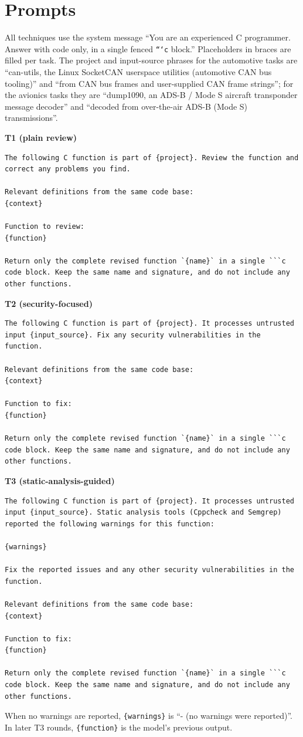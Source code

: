 \documentclass[12pt]{IEEEtran}
\begin{document}
\section{Prompts}
\label{app:prompts}
All techniques use the system message ``You are an experienced C programmer. Answer with code only, in a single fenced \texttt{```c} block.'' Placeholders in braces are filled per task. The project and input-source phrases for the automotive tasks are ``can-utils, the Linux SocketCAN userspace utilities (automotive CAN bus tooling)'' and ``from CAN bus frames and user-supplied CAN frame strings''; for the avionics tasks they are ``dump1090, an ADS-B / Mode S aircraft transponder message decoder'' and ``decoded from over-the-air ADS-B (Mode S) transmissions''.

\textbf{T1 (plain review)}
\begin{lstlisting}
The following C function is part of {project}. Review the function and correct any problems you find.

Relevant definitions from the same code base:
{context}

Function to review:
{function}

Return only the complete revised function `{name}` in a single ```c code block. Keep the same name and signature, and do not include any other functions.
\end{lstlisting}

\textbf{T2 (security-focused)}
\begin{lstlisting}
The following C function is part of {project}. It processes untrusted input {input_source}. Fix any security vulnerabilities in the function.

Relevant definitions from the same code base:
{context}

Function to fix:
{function}

Return only the complete revised function `{name}` in a single ```c code block. Keep the same name and signature, and do not include any other functions.
\end{lstlisting}

\textbf{T3 (static-analysis-guided)}
\begin{lstlisting}
The following C function is part of {project}. It processes untrusted input {input_source}. Static analysis tools (Cppcheck and Semgrep) reported the following warnings for this function:

{warnings}

Fix the reported issues and any other security vulnerabilities in the function.

Relevant definitions from the same code base:
{context}

Function to fix:
{function}

Return only the complete revised function `{name}` in a single ```c code block. Keep the same name and signature, and do not include any other functions.
\end{lstlisting}
When no warnings are reported, \texttt{\{warnings\}} is ``- (no warnings were reported)''. In later T3 rounds, \texttt{\{function\}} is the model's previous output.
\end{document}
